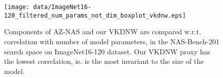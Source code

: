 
\begin{figure}
    \centering    
    \texttt{[image: data/ImageNet16-120\_filtered\_num\_params\_not\_dim\_boxplot\_vkdnw.eps]}
    \caption{Components of AZ-NAS \cite{lee2024az} and our VKDNW are compared w.r.t. correlation with number of model parameters, in the NAS-Bench-201 search space \cite{dong2020bench} on ImageNet16-120 \cite{chrabaszcz2017downsampled} dataset. Our VKDNW proxy has the lowest correlation, ie. is the most invariant to the size of the model.\vspace{-15pt}}
    \label{fig:boxplot_per_trainable_parameters}
\end{figure}